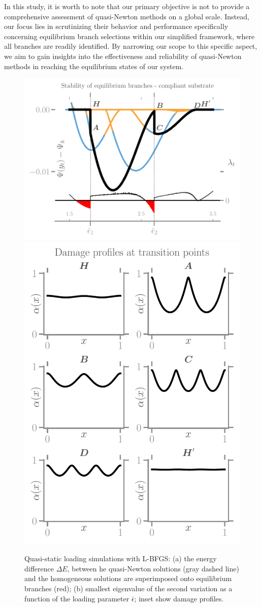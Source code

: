 In  this study, it is worth to note that our primary objective is not to provide a comprehensive assessment of quasi-Newton methods on a global scale. Instead, our focus lies in scrutinizing their behavior and performance specifically concerning equilibrium branch selections within our simplified framework, where all branches are readily identified. By narrowing our scope to this specific aspect, we aim to gain insights into the effectiveness and reliability of quasi-Newton methods in reaching the equilibrium states of our system.
\begin{figure}
\includegraphics[width=.7\textwidth]{../images/model_stiff_energy_kick.pdf}
\includegraphics[width=.4\textwidth]{../images/model_stiff_profiles.pdf}
    \caption{
Quasi-static loading simulations with L-BFGS: (a) the energy difference $\Delta E$, between he quasi-Newton solutions (gray dashed line) and the homogeneous solutions are superimposed onto equilibrium branches (red); (b) smallest eigenvalue of the second variation  as a function of the loading parameter $\bar\epsilon$; inset show damage profiles.}
    \label{fig:tempo1}
\end{figure}

